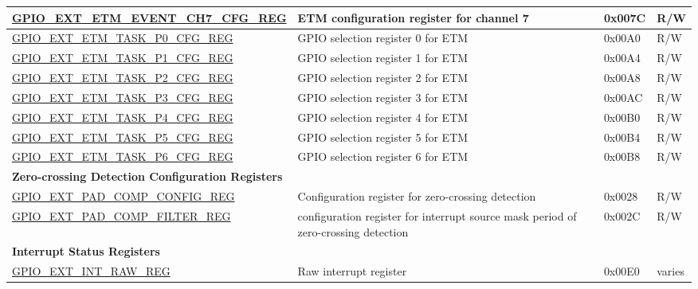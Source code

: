 \begin{longtable}{ | p{6.2cm} | p{7.2cm} | p{1.3cm} | p{1cm} | }
\hyperref[regdesc:GPIOSDETMEVENTCHNCFGREG]{GPIO\_EXT\_ETM\_EVENT\_CH7\_CFG\_REG} & ETM configuration register for channel 7 & 0x007C & R/W \\ \hline

\hyperref[regdesc:GPIOSDETMTASKP0CFGREG]{GPIO\_EXT\_ETM\_TASK\_P0\_CFG\_REG} & GPIO selection register 0 for ETM & 0x00A0 & R/W \\ \hline

\hyperref[regdesc:GPIOSDETMTASKP1CFGREG]{GPIO\_EXT\_ETM\_TASK\_P1\_CFG\_REG} & GPIO selection register 1 for ETM & 0x00A4 & R/W \\ \hline

\hyperref[regdesc:GPIOSDETMTASKP2CFGREG]{GPIO\_EXT\_ETM\_TASK\_P2\_CFG\_REG} & GPIO selection register 2 for ETM & 0x00A8 & R/W \\ \hline

\hyperref[regdesc:GPIOSDETMTASKP3CFGREG]{GPIO\_EXT\_ETM\_TASK\_P3\_CFG\_REG} & GPIO selection register 3 for ETM & 0x00AC & R/W \\ \hline

\hyperref[regdesc:GPIOSDETMTASKP4CFGREG]{GPIO\_EXT\_ETM\_TASK\_P4\_CFG\_REG} & GPIO selection register 4 for ETM & 0x00B0 & R/W \\ \hline

\hyperref[regdesc:GPIOSDETMTASKP5CFGREG]{GPIO\_EXT\_ETM\_TASK\_P5\_CFG\_REG} & GPIO selection register 5 for ETM & 0x00B4 & R/W \\ \hline

\hyperref[regdesc:GPIOSDETMTASKP6CFGREG]{GPIO\_EXT\_ETM\_TASK\_P6\_CFG\_REG} & GPIO selection register 6 for ETM & 0x00B8 & R/W \\ \hline


\multicolumn{4}{|l|}{\textbf{Zero-crossing Detection Configuration Registers}} \\ \hline

\hyperref[regdesc:GPIOSDPADCOMPCONFIGREG]{GPIO\_EXT\_PAD\_COMP\_CONFIG\_REG} &  Configuration register for zero-crossing detection & 0x0028 & R/W \\ \hline

\hyperref[regdesc:GPIOSDPADCOMPFILTERREG]{GPIO\_EXT\_PAD\_COMP\_FILTER\_REG} &  configuration register for interrupt source mask period of zero-crossing detection & 0x002C & R/W \\ \hline

\multicolumn{4}{|l|}{\textbf{Interrupt Status Registers}} \\ \hline

\hyperref[regdesc:GPIOSDINTRAWREG]{GPIO\_EXT\_INT\_RAW\_REG} &  Raw interrupt register & 0x00E0 & varies \\ \hline


\end{longtable}
